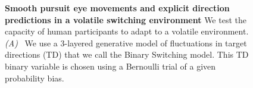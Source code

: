 \documentclass[10pt,letterpaper]{article}
\begin{document}
\begin{figure}%
\caption{
\textbf{Smooth pursuit eye movements and explicit direction predictions in a volatile switching environment}
We test the capacity of human participants to adapt to a volatile environment.
\textit{(A)}~
We use a 3-layered generative model of fluctuations in target directions (TD)
that we call the Binary Switching model.
This TD binary variable is chosen using a Bernoulli trial of a given probability bias.
}
\end{figure}
\end{document}
